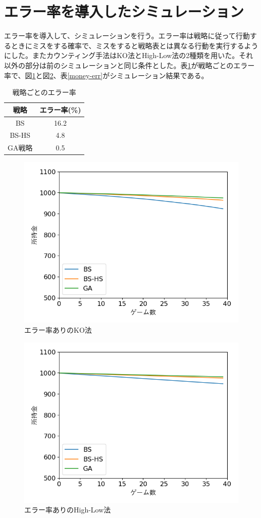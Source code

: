 \section{エラー率を導入したシミュレーション}
エラー率を導入して、シミュレーションを行う。エラー率は戦略に従って行動するときにミスをする確率で、ミスをすると戦略表とは異なる行動を実行するようにした。またカウンティング手法はKO法とHigh-Low法の2種類を用いた。それ以外の部分は前のシミュレーションと同じ条件とした。表\ref{err}が戦略ごとのエラー率で、図\ref{errKO}と図\ref{errHi-Lo}、表\ref{money-err}がシミュレーション結果である。
\begin{table}[H]
 \caption{戦略ごとのエラー率\label{err}}
 \begin{center}
  \begin{tabular}{|c|c|}
  \hline 戦略 & エラー率(\%) \\
  \hline BS & 16.2\\
  \hline BS-HS & 4.8 \\
  \hline GA戦略 & 0.5\\
  \hline
  \end{tabular}
 \end{center}
\end{table}

\begin{figure}[H]
 \begin{center} 
  \includegraphics[width=0.7\linewidth]{./figure/errKO}
  \caption{エラー率ありのKO法\label{errKO}}
 \end{center}
\end{figure}

\begin{figure}[H]
 \begin{center} 
  \includegraphics[width=0.7\linewidth]{./figure/errHi-Lo}
  \caption{エラー率ありのHigh-Low法\label{errHi-Lo}}
 \end{center}
\end{figure}

